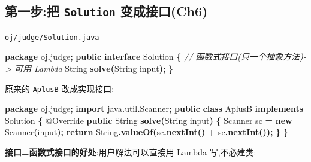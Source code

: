 \documentclass[
  11pt,
]{ctexart}
\newenvironment{Shaded}{\begin{snugshade}}{\end{snugshade}}
\newcommand{\AttributeTok}[1]{\textcolor[rgb]{0.13,0.29,0.53}{#1}}
\newcommand{\BuiltInTok}[1]{#1}
\newcommand{\CommentTok}[1]{\textcolor[rgb]{0.56,0.35,0.01}{\textit{#1}}}
\newcommand{\ControlFlowTok}[1]{\textcolor[rgb]{0.13,0.29,0.53}{\textbf{#1}}}
\newcommand{\FunctionTok}[1]{\textcolor[rgb]{0.13,0.29,0.53}{\textbf{#1}}}
\newcommand{\ImportTok}[1]{#1}
\newcommand{\KeywordTok}[1]{\textcolor[rgb]{0.13,0.29,0.53}{\textbf{#1}}}
\newcommand{\NormalTok}[1]{#1}
\newcommand{\OperatorTok}[1]{\textcolor[rgb]{0.81,0.36,0.00}{\textbf{#1}}}
\begin{document}
\hypertarget{ux7b2cux4e00ux6b65ux628a-solution-ux53d8ux6210ux63a5ux53e3ch6}{%
\subsection{\texorpdfstring{第一步:把 \texttt{Solution}
变成接口(Ch6)}{第一步:把 Solution 变成接口(Ch6)}}\label{ux7b2cux4e00ux6b65ux628a-solution-ux53d8ux6210ux63a5ux53e3ch6}}

\texttt{oj/judge/Solution.java}

\begin{Shaded}
\begin{Highlighting}[]
\KeywordTok{package}\ImportTok{ oj}\OperatorTok{.}\ImportTok{judge}\OperatorTok{;}
\KeywordTok{public} \KeywordTok{interface}\NormalTok{ Solution }\OperatorTok{\{}            \CommentTok{// 函数式接口(只一个抽象方法){-}\textgreater{} 可用 Lambda}
    \BuiltInTok{String} \FunctionTok{solve}\OperatorTok{(}\BuiltInTok{String}\NormalTok{ input}\OperatorTok{);}
\OperatorTok{\}}
\end{Highlighting}
\end{Shaded}

原来的 \texttt{AplusB} 改成实现接口:

\begin{Shaded}
\begin{Highlighting}[]
\KeywordTok{package}\ImportTok{ oj}\OperatorTok{.}\ImportTok{judge}\OperatorTok{;}
\KeywordTok{import} \ImportTok{java}\OperatorTok{.}\ImportTok{util}\OperatorTok{.}\ImportTok{Scanner}\OperatorTok{;}
\KeywordTok{public} \KeywordTok{class}\NormalTok{ AplusB }\KeywordTok{implements}\NormalTok{ Solution }\OperatorTok{\{}
    \AttributeTok{@Override} \KeywordTok{public} \BuiltInTok{String} \FunctionTok{solve}\OperatorTok{(}\BuiltInTok{String}\NormalTok{ input}\OperatorTok{)} \OperatorTok{\{}
        \BuiltInTok{Scanner}\NormalTok{ sc }\OperatorTok{=} \KeywordTok{new} \BuiltInTok{Scanner}\OperatorTok{(}\NormalTok{input}\OperatorTok{);}
        \ControlFlowTok{return} \BuiltInTok{String}\OperatorTok{.}\FunctionTok{valueOf}\OperatorTok{(}\NormalTok{sc}\OperatorTok{.}\FunctionTok{nextInt}\OperatorTok{()} \OperatorTok{+}\NormalTok{ sc}\OperatorTok{.}\FunctionTok{nextInt}\OperatorTok{());}
    \OperatorTok{\}}
\OperatorTok{\}}
\end{Highlighting}
\end{Shaded}

\textbf{接口=函数式接口的好处}:用户解法可以直接用 Lambda 写,不必建类:
\end{document}
